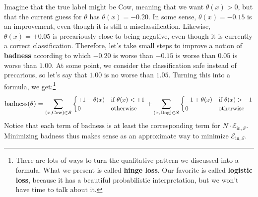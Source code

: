 \documentclass[openany, notitlepage, justified]{tufte-book}
\newcommand{\Ee}{\mathcal{E}}
\newcommand{\Ss}{\mathcal{S}}
\newcommand{\Ein}{\Ee_{\text{in},\Ss}}
\begin{document}
            Imagine that the true label might be Cow, meaning that we want
            $\theta(x)>0$, but that the current guess for $\theta$  has
            $\theta(x) = -0.20$.  In some sense, $\theta(x)=-0.15$ is an
            improvement, even though it is still a misclassification.
            Likewise, $\theta(x)=+0.05$ is precariously close to being
            negative, even though it is currently a correct classification.
            Therefore, let's take small steps to improve a notion
            of \textbf{badness} according to which $-0.20$ is
            worse than $-0.15$ is worse than $0.05$ is worse than $1.00$.  At
            some point, we consider the classification safe instead of precarious,
            so let's say that $1.00$ is no worse than $1.05$.
            Turning this into a formula, we get:\footnote{
                There are lots of ways to turn the qualitative pattern we 
                discussed into a formula.  What we present is called
                \textbf{hinge loss}.  Our favorite is called \textbf{logistic
                loss}, because it has a beautiful probabilistic interpretation,
                but we won't have time to talk about it.
            }
            \begin{align*}
                \text{badness}(\theta) = 
            {\small
                    \sum_{(x,\text{Cow})\in \Ss}
                    \begin{cases} 
                        +1-\theta(x)    &   \text{if}~\theta(x) < +1 \\
                        0               &   \text{otherwise}
                    \end{cases}
                    +
                    \sum_{(x,\text{Dog})\in \Ss}
                    \begin{cases} 
                        -1+\theta(x)    &   \text{if}~\theta(x) > -1\\
                        0               &   \text{otherwise}
                    \end{cases}
            }
            \end{align*}
            Notice that each term of $\text{badness}$ is at least the
            corresponding term for $N\cdot \Ein$.  Minimizing badness thus
            makes sense as an approximate way to minimize $\Ein$.
\end{document}
